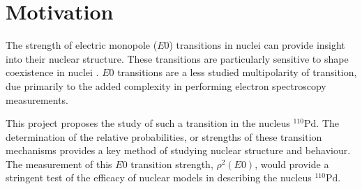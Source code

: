 \documentclass[twocolumn,preprintnumbers,amsmath,amssymb]{revtex4}
\begin{document}




\section{Motivation}

%

The strength of electric monopole ($E0$) transitions in nuclei can provide insight into their nuclear structure. These transitions are particularly sensitive to shape coexistence in nuclei \cite{evitts_1}. $E0$ transitions are a less studied multipolarity of transition, due primarily to the added complexity in performing electron spectroscopy measurements.

This project proposes the study of such a transition in the nucleus $^{110}\mathrm{Pd}$. The determination of the relative probabilities, or strengths of these transition mechanisms provides a key method of studying nuclear structure and behaviour. The measurement of this $E0$ transition strength, $\rho^2(E0)$, would provide a stringent test of the efficacy of nuclear models in describing the nucleus $^{110}\mathrm{Pd}$. 
\end{document}
